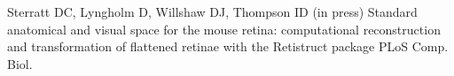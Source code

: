\documentclass{article}
\begin{document}
\begin{thebibliography}{99}
Sterratt DC, Lyngholm D, Willshaw DJ, Thompson ID (in press) Standard anatomical and visual space for the mouse retina:
computational reconstruction and transformation of flattened
retinae with the Retistruct package
\newblock PLoS Comp. Biol.
\end{thebibliography}
\end{document}
